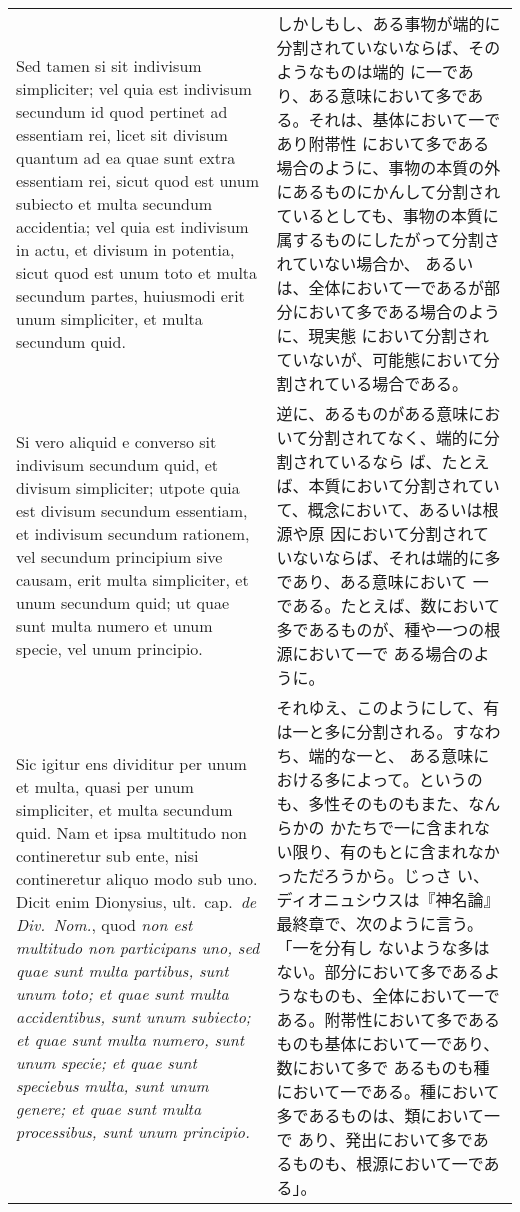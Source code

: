 \documentclass[10pt]{jsarticle} %
\begin{document}
\begin{longtable}{p{21em}p{21em}}
\\

Sed tamen si sit indivisum simpliciter; vel quia est indivisum
secundum id quod pertinet ad essentiam rei, licet sit divisum quantum ad
ea quae sunt extra essentiam rei, sicut quod est unum subiecto et multa
secundum accidentia; vel quia est indivisum in actu, et divisum in
potentia, sicut quod est unum toto et multa secundum partes, huiusmodi
erit unum simpliciter, et multa secundum quid. 

&

しかしもし、ある事物が端的に分割されていないならば、そのようなものは端的
に一であり、ある意味において多である。それは、基体において一であり附帯性
において多である場合のように、事物の本質の外にあるものにかんして分割され
ているとしても、事物の本質に属するものにしたがって分割されていない場合か、
あるいは、全体において一であるが部分において多である場合のように、現実態
において分割されていないが、可能態において分割されている場合である。


\\

Si vero aliquid e
converso sit indivisum secundum quid, et divisum simpliciter; utpote
quia est divisum secundum essentiam, et indivisum secundum rationem, vel
secundum principium sive causam, erit multa simpliciter, et unum
secundum quid; ut quae sunt multa numero et unum specie, vel unum
principio. 

&

逆に、あるものがある意味において分割されてなく、端的に分割されているなら
ば、たとえば、本質において分割されていて、概念において、あるいは根源や原
因において分割されていないならば、それは端的に多であり、ある意味において
一である。たとえば、数において多であるものが、種や一つの根源において一で
ある場合のように。


\\


Sic igitur ens dividitur per unum et multa, quasi per unum simpliciter,
et multa secundum quid. Nam et ipsa multitudo non contineretur sub ente,
nisi contineretur aliquo modo sub uno. Dicit enim Dionysius,
ult.~cap.~{\it de Div.~Nom.}, quod {\it non est multitudo non
participans uno, sed quae sunt multa partibus, sunt unum toto; et quae
sunt multa accidentibus, sunt unum subiecto; et quae sunt multa numero,
sunt unum specie; et quae sunt speciebus multa, sunt unum genere; et
quae sunt multa processibus, sunt unum principio.}

&


それゆえ、このようにして、有は一と多に分割される。すなわち、端的な一と、
ある意味における多によって。というのも、多性そのものもまた、なんらかの
かたちで一に含まれない限り、有のもとに含まれなかっただろうから。じっさ
い、ディオニュシウスは『神名論』最終章で、次のように言う。「一を分有し
ないような多はない。部分において多であるようなものも、全体において一で
ある。附帯性において多であるものも基体において一であり、数において多で
あるものも種において一である。種において多であるものは、類において一で
あり、発出において多であるものも、根源において一である」。



\end{longtable}
\end{document}
